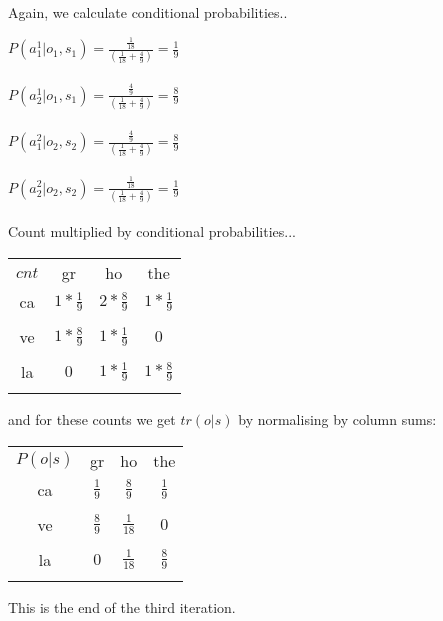 \documentclass[12pt]{report}
\begin{document}
Again, we calculate conditional probabilities..

$P(a^1_1|o_1,s_1) = \frac{\frac{1}{18}}{(\frac{1}{18} + \frac{4}{9})} = \frac{1}{9}$\\\\

$P(a^1_2|o_1,s_1) = \frac{\frac{4}{9}}{(\frac{1}{18} + \frac{4}{9})} = \frac{8}{9}$\\\\

$P(a^2_1|o_2,s_2) = \frac{\frac{4}{9}}{(\frac{1}{18} + \frac{4}{9})} = \frac{8}{9}$\\\\

$P(a^2_2|o_2,s_2) = \frac{\frac{1}{18}}{(\frac{1}{18} + \frac{4}{9})} = \frac{1}{9}$\\\\

Count multiplied by conditional probabilities...\\
\begin{center}
\begin{tabular}{c c c c}
$cnt$ & gr & ho & the \\
ca & $1*\frac{1}{9}$ & $2*\frac{8}{9}$ & $1*\frac{1}{9}$ \\\\
ve & $1*\frac{8}{9}$ & $1*\frac{1}{9}$ & $0$ \\\\
la & $0$ & $1*\frac{1}{9}$ & $1*\frac{8}{9}$ \\\\
\end{tabular}
\end{center}
and for these counts we get $tr(o|s)$ by normalising by column sums:
\begin{center}
\begin{tabular}{c c c c}
$P(o|s)$ & gr & ho & the \\
ca & $\frac{1}{9}$ & $\frac{8}{9}$ & $\frac{1}{9}$ \\\\
ve & $\frac{8}{9}$ & $\frac{1}{18}$ & $0$ \\\\
la & $0$ & $\frac{1}{18}$ & $\frac{8}{9}$ \\\\
\end{tabular}
\end{center}
This is the end of the third iteration.
\end{document}
